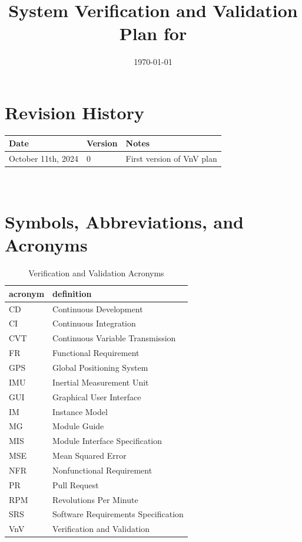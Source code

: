 \documentclass[12pt, titlepage]{article}
\begin{document}
\title{System Verification and Validation Plan for \progname{}} 
\author{\authname}
\date{\today}
	
\maketitle


\section*{Revision History}

\begin{tabularx}{\textwidth}{p{3cm}p{2cm}X}
\toprule {\bf Date} & {\bf Version} & {\bf Notes}\\
\midrule
October 11th, 2024 & 0 & First version of VnV plan\\
\bottomrule
\end{tabularx}

~\\

\newpage

\tableofcontents

\listoftables


\listoffigures


\newpage

\section{Symbols, Abbreviations, and Acronyms}

\begin{table}[h]
  \raggedright
  \begin{tabular}{l l} 
    \toprule		
    \textbf{acronym} & \textbf{definition}\\
    \midrule
    CD & Continuous Development\\
    CI & Continuous Integration\\ 
    CVT & Continuous Variable Transmission\\
    FR & Functional Requirement\\
    GPS & Global Positioning System\\
    IMU & Inertial Measurement Unit\\
    GUI & Graphical User Interface\\
    IM & Instance Model\\
    MG & Module Guide\\
    MIS & Module Interface Specification\\
    MSE & Mean Squared Error\\
    NFR & Nonfunctional Requirement\\
    PR & Pull Request\\
    RPM & Revolutions Per Minute\\
    SRS & Software Requirements Specification\\
    VnV & Verification and Validation\\
    \bottomrule
  \end{tabular}
  \caption{Verification and Validation Acronyms}
  \label{tab:vnv_acronyms}
\end{table}
\end{document}

